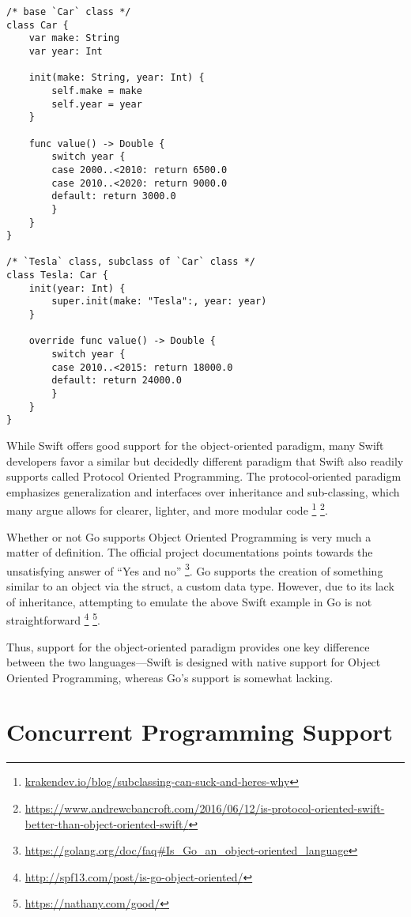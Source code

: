 \documentclass[letterpaper]{article}
\begin{document}
\begin{verbatim}
/* base `Car` class */
class Car {
    var make: String
    var year: Int

    init(make: String, year: Int) {
        self.make = make
        self.year = year
    }

    func value() -> Double {
        switch year {
        case 2000..<2010: return 6500.0
        case 2010..<2020: return 9000.0
        default: return 3000.0
        }
    }
}

/* `Tesla` class, subclass of `Car` class */
class Tesla: Car {
    init(year: Int) {
        super.init(make: "Tesla":, year: year)
    }

    override func value() -> Double {
        switch year {
        case 2010..<2015: return 18000.0
        default: return 24000.0
        }
    }
}
\end{verbatim}

While Swift offers good support for the object-oriented paradigm, many Swift developers favor a similar but decidedly different paradigm that Swift also readily supports called Protocol Oriented Programming. The protocol-oriented paradigm emphasizes generalization and interfaces over inheritance and sub-classing, which many argue allows for clearer, lighter, and more modular code \footnote{\url{krakendev.io/blog/subclassing-can-suck-and-heres-why}} \footnote{\url{https://www.andrewcbancroft.com/2016/06/12/is-protocol-oriented-swift-
better-than-object-oriented-swift/}}.

Whether or not Go supports Object Oriented Programming is very much a matter of definition. The official project documentations points towards the unsatisfying answer of “Yes and no” \footnote{\url{https://golang.org/doc/faq#Is_Go_an_object-oriented_language}}. Go supports the creation of something similar to an object via the struct, a custom data type. However, due to its lack of inheritance, attempting to emulate the above Swift example in Go is not straightforward \footnote{\url{http://spf13.com/post/is-go-object-oriented/}} \footnote{\url{https://nathany.com/good/}}.

Thus, support for the object-oriented paradigm provides one key difference between the two languages—Swift is designed with native support for Object Oriented Programming, whereas Go’s support is somewhat lacking.

\section{Concurrent Programming Support}
\end{document}
